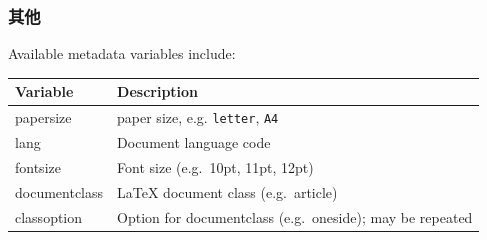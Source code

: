 \documentclass[]{book}
\theoremstyle{definition}
\theoremstyle{definition}
\theoremstyle{definition}
\theoremstyle{remark}
\begin{document}
\subsubsection{其他}

Available metadata variables include:

\begin{longtable}[]{@{}ll@{}}
\toprule
\begin{minipage}[b]{0.05\columnwidth}\raggedright\strut
Variable\strut
\end{minipage} & \begin{minipage}[b]{0.05\columnwidth}\raggedright\strut
Description\strut
\end{minipage}\tabularnewline
\midrule
\endhead
\begin{minipage}[t]{0.05\columnwidth}\raggedright\strut
papersize\strut
\end{minipage} & \begin{minipage}[t]{0.05\columnwidth}\raggedright\strut
paper size, e.g. \texttt{letter}, \texttt{A4}\strut
\end{minipage}\tabularnewline
\begin{minipage}[t]{0.05\columnwidth}\raggedright\strut
lang\strut
\end{minipage} & \begin{minipage}[t]{0.05\columnwidth}\raggedright\strut
Document language code\strut
\end{minipage}\tabularnewline
\begin{minipage}[t]{0.05\columnwidth}\raggedright\strut
fontsize\strut
\end{minipage} & \begin{minipage}[t]{0.05\columnwidth}\raggedright\strut
Font size (e.g.~10pt, 11pt, 12pt)\strut
\end{minipage}\tabularnewline
\begin{minipage}[t]{0.05\columnwidth}\raggedright\strut
documentclass\strut
\end{minipage} & \begin{minipage}[t]{0.05\columnwidth}\raggedright\strut
LaTeX document class (e.g.~article)\strut
\end{minipage}\tabularnewline
\begin{minipage}[t]{0.05\columnwidth}\raggedright\strut
classoption\strut
\end{minipage} & \begin{minipage}[t]{0.05\columnwidth}\raggedright\strut
Option for documentclass (e.g.~oneside); may be repeated\strut
\end{minipage}\tabularnewline

\end{longtable}
\end{document}
